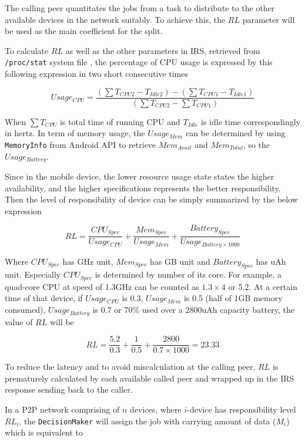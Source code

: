 \documentclass[conference]{IEEEtran}
\begin{document}
The calling peer quantitates the jobs from a task to distribute to the other available devices in the network suitably. To achieve this, the $RL$ parameter will be used as the main coefficient for the split. 
 
To calculate $RL$ as well as the other parameters in IRS, retrieved from \texttt{/proc/stat} system file \cite{stat_explain}, the percentage of CPU usage is expressed by this following expression in two short consecutive times

\begin{equation}
\label{eq:cpu_usage}
Usage_{CPU} = \frac{(\sum{T_{CPU2}} - T_{Idle2}) - (\sum{T_{CPU1}} - T_{Idle1})}{(\sum{T_{CPU2}} - \sum{T_{CPU1}})}
\end{equation}

When $\sum{T_{CPU}}$ is total time of running CPU and $T_{Idle}$ is idle time correspondingly in hertz. In term of memory usage, the $Usage_{Mem}$ can be determined by using \texttt{MemoryInfo} from Android API to retrieve $Mem_{Avail}$ and $Mem_{Total}$, so the $Usage_{Battery}$.

Since in the mobile device, the lower resource usage state states the higher availability, and the higher specifications represents the better responsibility. Then the level of responsibility of device can be simply summarized by the below expression

\begin{equation}
\label{eq:res_level}
RL = \frac{CPU_{Spec}}{Usage_{CPU}} + \frac{Mem_{Spec}}{Usage_{Mem}} + \frac{Battery_{Spec}}{Usage_{Battery \times 1000}}
\end{equation}

Where $CPU_{Spec}$ has GHz unit, $Mem_{Spec}$ has GB unit and $Battery_{Spec}$ has uAh unit. Especially $CPU_{Spec}$ is determined by number of its core. For example, a quad-core CPU at speed of 1.3GHz can be counted as $1.3 \times 4$ or 5.2. At a certain time of that device, if $Usage_{CPU}$ is 0.3, $Usage_{Mem}$ is 0.5 (half of 1GB memory consumed), $Usage_{Battery}$ is 0.7 or 70\% used over a 2800uAh capacity battery, the value of $RL$ will be

$$RL = \frac{5.2}{0.3} + \frac{1}{0.5} + \frac{2800}{0.7 \times 1000} = 23.33$$

To reduce the latency and to avoid miscalculation at the calling peer, $RL$ is prematurely calculated by each available called peer and wrapped up in the IRS response sending back to the caller. 

In a P2P network comprising of $n$ devices, where $i$-device has responsibility level $RL_{i}$, the \texttt{DecisionMaker} will assign the job with carrying amount of data ($M_{i}$) which is equivalent to
\end{document}
